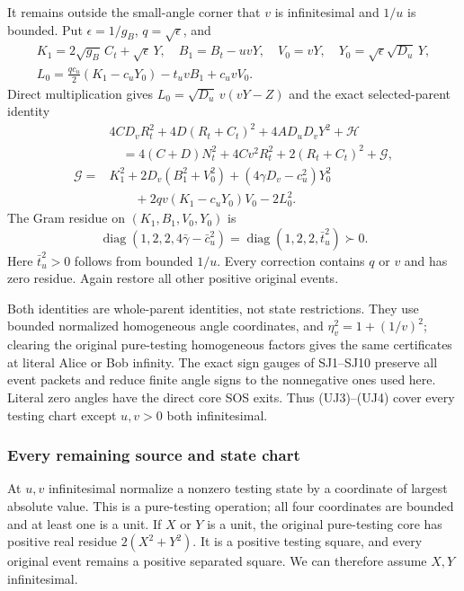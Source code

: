 It remains outside the small-angle corner that $v$ is infinitesimal
and $1/u$ is bounded. Put $\epsilon=1/g_B$, $q=\sqrt\epsilon$, and
\[
\begin{gathered}
 K_1=2\sqrt{g_B}\,C_t+\sqrt\epsilon\,Y,\quad
 B_1=B_t-uvY,\quad V_0=vY,\quad
 Y_0=\sqrt\epsilon\sqrt{D_u}\,Y,\\
 L_0=\frac{qc_u}{2}(K_1-c_uY_0)-t_uvB_1+c_uvV_0.
\end{gathered}
\]
Direct multiplication gives
$L_0=\sqrt{D_u}\,v(vY-Z)$ and the exact selected-parent identity
\[
\begin{split}
 &4CD_vR_t^2+4D(R_t+C_t)^2+4AD_uD_vY^2+\mathcal H\\
 &\quad=4(C+D)N_t^2+4Cv^2R_t^2+2(R_t+C_t)^2+\mathcal G,\\
 \mathcal G={}&K_1^2+2D_v(B_1^2+V_0^2)
 +(4\gamma D_v-c_u^2)Y_0^2\\
 &\qquad+2qv(K_1-c_uY_0)V_0-2L_0^2.
\end{split}                                                     \tag{UJ4}
\]
The Gram residue on $(K_1,B_1,V_0,Y_0)$ is
\[
        \operatorname{diag}(1,2,2,4\bar\gamma-\bar c_u^2)
        =\operatorname{diag}(1,2,2,\bar t_u^2)\succ0.
\]
Here $\bar t_u^2>0$ follows from bounded $1/u$. Every correction
contains $q$ or $v$ and has zero residue. Again restore all other
positive original events.

Both identities are whole-parent identities, not state
restrictions. They use bounded normalized homogeneous angle
coordinates, and $\eta_v^2=1+(1/v)^2$; clearing the original
pure-testing homogeneous factors gives the same certificates
at literal Alice or Bob infinity. The exact sign gauges of
SJ1--SJ10 preserve all event packets and reduce finite angle
signs to the nonnegative ones used here. Literal zero angles
have the direct core SOS exits. Thus (UJ3)--(UJ4) cover every
testing chart except $u,v>0$ both infinitesimal.

\subsubsection*{Every remaining source and state chart}

At $u,v$ infinitesimal normalize a nonzero testing state by a
coordinate of largest absolute value. This is a pure-testing
operation; all four coordinates are bounded and at least one
is a unit. If $X$ or $Y$ is a unit, the original pure-testing
core has positive real residue $2(X^2+Y^2)$. It is a positive
testing square, and every original event remains a positive
separated square. We can therefore assume $X,Y$ infinitesimal.

